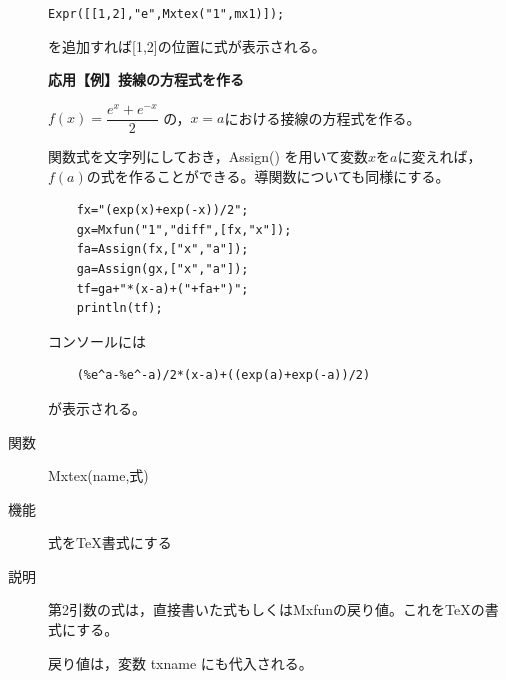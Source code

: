 \documentclass[papersize,a4paper,12pt,uplatex]{jsarticle}
\begin{document}
\begin{description}
    \verb|Expr([[1,2],"e",Mxtex("1",mx1)]);|
    
を追加すれば[1,2]の位置に式が表示される。

\vspace{\baselineskip}
{\bf 応用【例】接線の方程式を作る}

\vspace{\baselineskip}
  $f(x)=\dfrac{e^x+e^{-x}}{2}$ の，$x=a$における接線の方程式を作る。
  
  関数式を文字列にしておき，Assign() を用いて変数$x$を$a$に変えれば，$f(a)$の式を作ることができる。導関数についても同様にする。
  
\begin{verbatim}
    fx="(exp(x)+exp(-x))/2";
    gx=Mxfun("1","diff",[fx,"x"]);
    fa=Assign(fx,["x","a"]);
    ga=Assign(gx,["x","a"]);
    tf=ga+"*(x-a)+("+fa+")";
    println(tf);
\end{verbatim}
  コンソールには
\begin{verbatim}
    (%e^a-%e^-a)/2*(x-a)+((exp(a)+exp(-a))/2) 
\end{verbatim}
が表示される。

\vspace{\baselineskip}
\hypertarget{mxtex}{}
\item[関数]  Mxtex(name,式)
\item[機能]  式をTeX書式にする
\item[説明]  第2引数の式は，直接書いた式もしくはMxfunの戻り値。これをTeXの書式にする。

戻り値は，変数 txname にも代入される。


\end{description}
\end{document}
